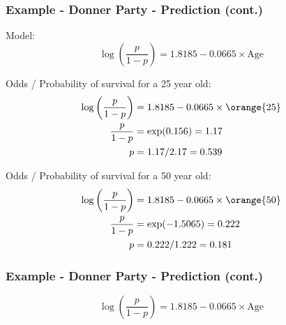 
\begin{frame}
\frametitle{Example - Donner Party - Prediction (cont.)}

Model:
{\scriptsize
\[\log\left(\frac{p}{1-p}\right) = 1.8185-0.0665\times \text{Age}\]
}

Odds / Probability of survival for a 25 year old:
\pause
{\scriptsize
\begin{align*}
\log\left(\frac{p}{1-p}\right) &= 1.8185-0.0665\times \orange{25}\\
\frac{p}{1-p} &= \exp(0.156) = 1.17 \\
p &= 1.17/2.17 = 0.539 
\end{align*}
}

\pause

Odds / Probability of survival for a 50 year old:
\pause
{\scriptsize
\begin{align*}
\log\left(\frac{p}{1-p}\right) &= 1.8185-0.0665\times \orange{50}\\
\frac{p}{1-p} &= \exp(-1.5065) = 0.222 \\
p &= 0.222/1.222 =  0.181
\end{align*}
}

\end{frame}


\begin{frame}
\frametitle{Example - Donner Party - Prediction (cont.)}

{\scriptsize
\[\log\left(\frac{p}{1-p}\right) = 1.8185-0.0665\times \text{Age}\]
}

\vspace{-10mm}

\begin{center}
\end{center}
\end{frame}


